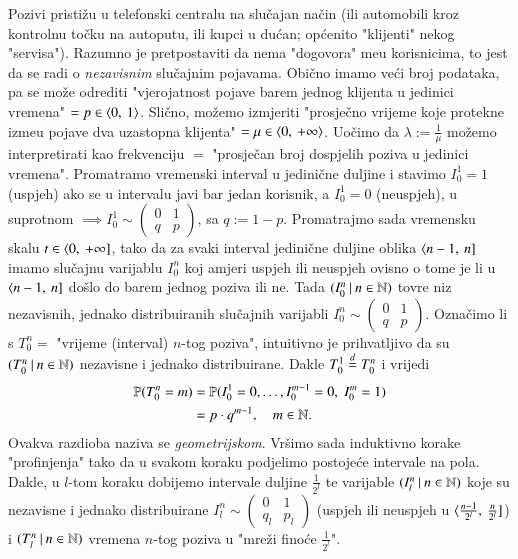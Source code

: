 \begin{pr}  \label{pr:10.2}
    Pozivi pristi\v zu u telefonski centralu na slu\v cajan na\v cin (ili automobili kroz kontrolnu to\v cku na autoputu, ili kupci u du\' can; op\' cenito "klijenti" nekog "servisa").
    Razumno je pretpostaviti da nema "dogovora" me\dj u korisnicima, to jest da se radi o \emph{nezavisnim} slu\v cajnim pojavama.
    Obi\v cno imamo ve\' ci broj podataka, pa se mo\v ze odrediti "vjerojatnost pojave barem jednog klijenta u jedinici vremena" $= p \in \langle {0}, \: {1} \rangle$.
    Sli\v cno, mo\v zemo izmjeriti "prosje\v cno vrijeme koje protekne izme\dj u pojave dva uzastopna klijenta" $= \mu \in \langle {0}, \: {+\infty} \rangle$.
    Uo\v cimo da $\lambda := \frac{1}{\mu}$ mo\v zemo interpretirati kao frekvenciju $=$ "prosje\v can broj dospjelih poziva u jedinici vremena".
    Promatramo vremenski interval u jedini\v cne duljine i stavimo $I_0^1 = 1$ (uspjeh) ako se u intervalu javi bar jedan korisnik, a $I_0^1 = 0$ (neuspjeh), u suprotnom $\implies I_0^1 \sim \begin{pmatrix} 0 & 1\\ q & p \end{pmatrix}$, sa $q:= 1 - p$.
    Promatrajmo sada vremensku skalu $t \in \langle {0}, \: {+\infty}]$, tako da za svaki interval jedini\v cne duljine oblika $\langle {n - 1}, \: {n}]$ imamo slu\v cajnu varijablu $I_0^n$ koj amjeri uspjeh ili neuspjeh ovisno o tome je li u $\langle {n - 1}, \: {n}]$ do\v slo do barem jednog poziva ili ne.
    Tada $({I_0^n} \: | \: {n \in \mathbb{N}})$ tovre niz nezavisnih, jednako distribuiranih slu\v cajnih varijabli $I_0^n \sim \begin{pmatrix}0 & 1\\ q & p \end{pmatrix}$.
    Ozna\v cimo li s $T_0^n =$ "vrijeme (interval) $n$-tog poziva", intuitivno je prihvatljivo da su $({T_0^n} \: | \: {n \in \mathbb{N}})$ nezavisne i jednako distribuirane.
    Dakle $T_0^1 \overset{d}{=} T_0^n$ i vrijedi
    \begin{equation*}
        \begin{aligned}
        \mathbb{P}({T_0^n = m}) &= \mathbb{P}({I_0^1 = 0, \ldots, I_0^{m - 1} = 0,  \; I_0^m = 1})\\
        &= p \cdot q^{m - 1}, \quad m \in \mathbb{N}.
        \end{aligned} 
    \end{equation*}
    Ovakva razdioba naziva se \emph{geometrijskom}.
    Vr\v simo sada induktivno korake "profinjenja" tako da u svakom koraku podjelimo postoje\' ce intervale na pola.
    Dakle, u $l$-tom koraku dobijemo intervale duljine $\frac{1}{2^l}$ te varijable $({I_l^n} \: | \: {n \in \mathbb{N}})$ koje su nezavisne i jednako distribuirane $I_l^n \sim \begin{pmatrix} 0 & 1 \\ q_l & p_l \end{pmatrix}$ (uspjeh ili neuspjeh u $\langle {\frac{n - 1}{2^l}}, \: {\frac{n}{2^l}}]$) i $({T_l^n} \: | \: {n \in \mathbb{N}})$ vremena $n$-tog poziva u "mre\v zi fino\' ce $\frac{1}{2^l}$".

\end{pr}

